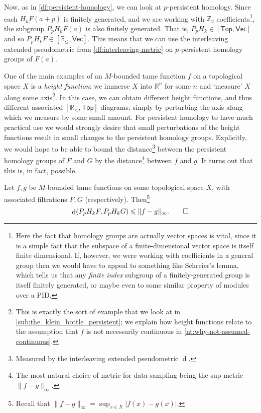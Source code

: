 \documentclass[12pt]{article}
\numberwithin{equation}{subsection}
\numberwithin{theorem}{subsection}
\numberwithin{lemma}{subsection}
\numberwithin{corollary}{subsection}
\numberwithin{definition}{subsection}
\numberwithin{example}{subsection}
\numberwithin{note}{subsection}
\newcommand{\zz}{\mathbb{Z}}
\newcommand{\rr}{\mathbb{R}}
\newcommand{\rrleq}{\rr_\leqslant}
\newcommand{\Vecrrdiag}{[\rr_\leqslant,\mathsf{Vec}]}
\newcommand{\Top}{\mathsf{Top}}
\DeclareMathOperator{\dist}{d}
\begin{document}
            Now, as in \cref{df:persistent-homology}, we can look at $p$-persistent homology.
            Since each $H_kF(a+p)$ is finitely generated, and we are working with $\zz_2$ coefficients\footnote{
                Here the fact that homology groups are actually vector spaces is vital, since it is a simple fact that the subspace of a finite-dimensional vector space is itself finite dimensional.
                If, however, we were working with coefficients in a general group then we would have to appeal to something like Schreier's lemma, which tells us that any \emph{finite index} subgroup of a finitely-generated group is itself finitely generated, or maybe even to some similar property of modules over a PID.
            }, the subgroup $P_pH_kF(a)$ is also finitely generated.
            That is, $P_pH_k\in[\Top,\mathsf{Vec}]$ and so $P_pH_kF\in\Vecrrdiag$.
            This means that we can use the interleaving extended pseudometric from \cref{df:interleaving-metric} on $p$-persistent homology groups of $F(a)$.

            \bigskip

            One of the main examples of an $M$-bounded tame function $f$ on a topological space $X$ is a \emph{height function}: we immerse $X$ into $\rr^n$ for some $n$ and `measure' $X$ along some axis\footnote{
                This is exactly the sort of example that we look at in \cref{sub:the_klein_bottle_persistent}; we explain how height functions relate to the assumption that $f$ is not necessarily continuous in \cref{nt:why-not-assumed-continuous}.
            }.
            In this case, we can obtain different height functions, and thus different associated $[\rrleq,\Top]$ diagrams, simply by perturbing the axis along which we measure by some small amount.
            For persistent homology to have much practical use we would strongly desire that small perturbations of the height functions result in small changes to the persistent homology groups.
            Explicitly, we would hope to be able to bound the distance\footnote{
                Measured by the interleaving extended pseudometric $\dist$.
            } between the persistent homology groups of $F$ and $G$ by the distance\footnote{
                The most natural choice of metric for data sampling being the sup metric $\|f-g\|_\infty$.
            } between $f$ and $g$.
            It turns out that this is, in fact, possible.

            \begin{theorem}\label{th:stability-for-persistent}
                Let $f,g$ be $M$-bounded tame functions on some topological space $X$, with associated filtrations $F,G$ (respectively).
                Then\footnote{
                    Recall that $\|f-g\|_\infty=\sup_{x\in X}|f(x)-g(x)|$.
                }
                \begin{equation*}
                    \dist(P_pH_kF,P_pH_kG)\leqslant\|f-g\|_\infty.\qedhere
                \end{equation*}
            \end{theorem}
\end{document}
